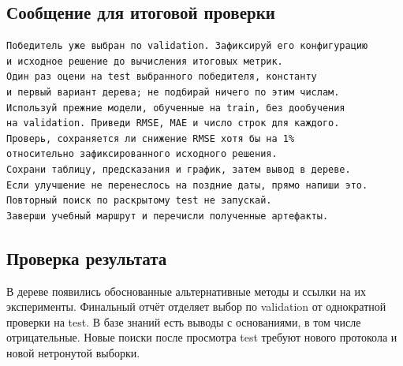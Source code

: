 \documentclass[10pt,a4paper]{article}
\begin{document}
\subsection*{Сообщение для итоговой проверки}
\begin{promptbox}
\begin{Verbatim}
Победитель уже выбран по validation. Зафиксируй его конфигурацию
и исходное решение до вычисления итоговых метрик.
Один раз оцени на test выбранного победителя, константу
и первый вариант дерева; не подбирай ничего по этим числам.
Используй прежние модели, обученные на train, без дообучения
на validation. Приведи RMSE, MAE и число строк для каждого.
Проверь, сохраняется ли снижение RMSE хотя бы на 1%
относительно зафиксированного исходного решения.
Сохрани таблицу, предсказания и график, затем вывод в дереве.
Если улучшение не перенеслось на поздние даты, прямо напиши это.
Повторный поиск по раскрытому test не запускай.
Заверши учебный маршрут и перечисли полученные артефакты.
\end{Verbatim}
\end{promptbox}
\subsection*{Проверка результата}
В дереве появились обоснованные альтернативные методы и ссылки на их эксперименты. Финальный отчёт отделяет выбор по validation от однократной проверки на test. В базе знаний есть выводы с основаниями, в том числе отрицательные. Новые поиски после просмотра test требуют нового протокола и новой нетронутой выборки.
\end{document}
